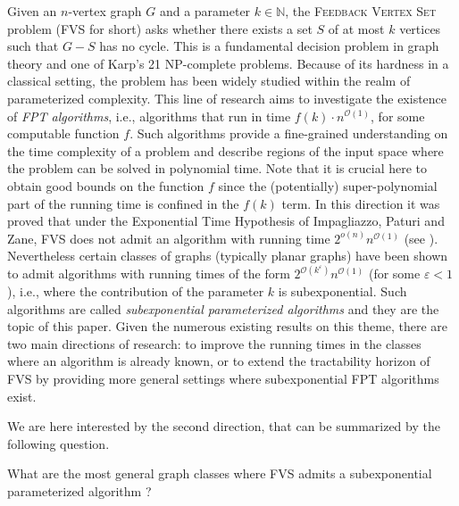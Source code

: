 \documentclass{amsart}
\newcommand{\eps}{\varepsilon}
\newcommand{\fvs}{\textsc{Feedback Vertex Set}\xspace}
\newcommand{\FVS}{\textsc{FVS}\xspace}
\renewcommand{\O}{\mathcal{O}}
\begin{document}
Given an $n$-vertex graph $G$ and a parameter $k\in \mathbb{N}$, the \fvs problem (\FVS for short) asks whether there exists a set $S$ of at most $k$ vertices such that $G-S$ has no cycle. 
This is a fundamental decision problem in graph theory and one of Karp's 21 NP-complete problems. Because of its hardness in a classical setting, the problem has been widely studied within the realm of parameterized complexity.
This line of research aims to investigate the existence of \emph{FPT algorithms}, i.e., algorithms that run in time $f(k)\cdot n^{\O(1)}$, for some computable function $f$. Such algorithms provide a fine-grained understanding on the time complexity of a problem and describe regions of the input space where the problem can be solved in polynomial time. Note that it is crucial here to obtain good bounds on the function $f$ since the (potentially) super-polynomial part of the running time is confined in the $f(k)$ term. In this direction it was proved that under the Exponential Time Hypothesis of Impagliazzo, Paturi and Zane, FVS does not admit an algorithm with running time $2^{o(n)}n^{\O(1)}$ (see \cite{Cygan2015Book}). Nevertheless certain classes of graphs (typically planar graphs) have been shown to admit algorithms with running times of the form $2^{\O(k^{\eps})} n^{\O(1)}$ (for some $\eps<1$), i.e., where the contribution of the parameter $k$ is subexponential. Such algorithms are called \emph{subexponential parameterized algorithms} and they are the topic of this paper.
Given the numerous existing results on this theme, there are two main directions of research: to improve the running times in the classes where an algorithm is already known, or to extend the tractability horizon of \FVS by providing more general settings where subexponential FPT algorithms exist.

We are here interested by the second direction, that can be summarized by the following question.
\begin{question}\label{q:main}
What are the most general graph classes where \FVS admits a subexponential parameterized algorithm ?
\end{question}
\end{document}
